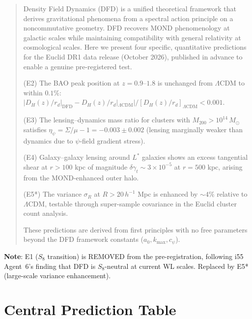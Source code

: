 \documentclass[11pt,a4paper]{article}
\begin{document}
\begin{quote}
Density Field Dynamics (DFD) is a unified theoretical framework that derives gravitational phenomena from a spectral action principle on a noncommutative geometry. DFD recovers MOND phenomenology at galactic scales while maintaining compatibility with general relativity at cosmological scales. Here we present four specific, quantitative predictions for the Euclid DR1 data release (October 2026), published in advance to enable a genuine pre-registered test.

(E2) The BAO peak position at $z = 0.9$--$1.8$ is unchanged from $\Lambda$CDM to within $0.1\%$: $|D_H(z)/r_d|_{\mathrm{DFD}} - D_H(z)/r_d|_{\Lambda\mathrm{CDM}}|/[D_H(z)/r_d]_{\Lambda\mathrm{CDM}} < 0.001$.

(E3) The lensing--dynamics mass ratio for clusters with $M_{200} > 10^{14}\,M_\odot$ satisfies $\eta_\psi = \Sigma/\mu - 1 = -0.003 \pm 0.002$ (lensing marginally weaker than dynamics due to $\psi$-field gradient stress).

(E4) Galaxy--galaxy lensing around $L^*$ galaxies shows an excess tangential shear at $r > 100$ kpc of magnitude $\delta\gamma_t \sim 3 \times 10^{-5}$ at $r = 500$ kpc, arising from the MOND-enhanced outer halo.

(E5*) The variance $\sigma_R$ at $R > 20\,h^{-1}$ Mpc is enhanced by $\sim 4\%$ relative to $\Lambda$CDM, testable through super-sample covariance in the Euclid cluster count analysis.

These predictions are derived from first principles with no free parameters beyond the DFD framework constants ($a_0, k_{\max}, c_\psi$).
\end{quote}

\textbf{Note}: E1 ($S_8$ transition) is REMOVED from the pre-registration, following i55 Agent~6's finding that DFD is $S_8$-neutral at current WL scales. Replaced by E5* (large-scale variance enhancement).

\section{Central Prediction Table}
\end{document}
